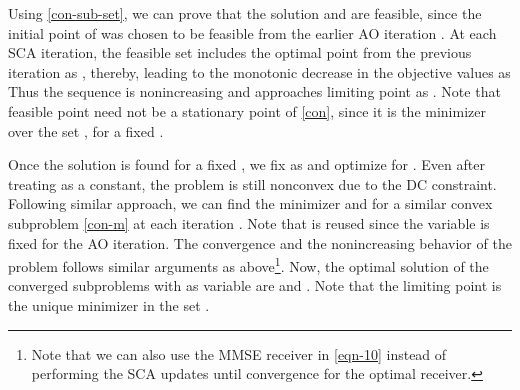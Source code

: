 Using \eqref{con-sub-set}, we can prove that the solution  and  are feasible, since the initial point of  was chosen to be feasible from the earlier \ac{AO} iteration . At each \ac{SCA} iteration, the feasible set includes the optimal point from the previous iteration as , thereby, leading to the monotonic decrease in the objective values \cite{lanckriet2009convergence,scutari_1,quoc2011sequential} as
\iftoggle{single_column}{
\begin{equation} \label{con-convergence}
f(\iter{\mx}{0}{i},\iter{\my}{\ast}{i-1},\iter{\mz}{0}{i}) \geq f(\iter{\mx}{k}{i},\iter{\my}{\ast}{i-1},\iter{\mz}{k}{i}) \geq f(\iter{\mx}{k+1}{i},\iter{\my}{\ast}{i-1},\iter{\mz}{k+1}{i}) \geq f(\iter{\mx}{\ast}{i},\iter{\my}{\ast}{i-1},\iter{\mz}{\ast|\my}{i}). 
\end{equation}}{
\begin{multline} \label{con-convergence}
f(\iter{\mx}{0}{i},\iter{\my}{\ast}{i-1},\iter{\mz}{0}{i}) \geq f(\iter{\mx}{k}{i},\iter{\my}{\ast}{i-1},\iter{\mz}{k}{i}) \\ \geq f(\iter{\mx}{k+1}{i},\iter{\my}{\ast}{i-1},\iter{\mz}{k+1}{i}) \geq f(\iter{\mx}{\ast}{i},\iter{\my}{\ast}{i-1},\iter{\mz}{\ast|\my}{i}). 
\end{multline}}
Thus the sequence  is nonincreasing and approaches limiting point as . Note that feasible point  need not be a stationary point of \eqref{con}, since it is the minimizer over the set , for a fixed \me{\my}.

Once the solution is found for a fixed \me{\my}, we fix \me{\mx} as  and optimize for \me{\my}. Even after treating \me{\mx} as a constant, the problem is still nonconvex due to the \ac{DC} constraint. Following similar approach, we can find the minimizer  and  for a similar convex subproblem \eqref{con-m} at each iteration . Note that  is reused since the variable \me{\mx} is fixed for the  \ac{AO} iteration. The convergence and the nonincreasing behavior of the problem follows similar arguments as above\footnote{Note that we can also use the \ac{MMSE} receiver in \eqref{eqn-10} instead of performing the \ac{SCA} updates until convergence for the optimal receiver.}. Now, the optimal solution of the converged subproblems with \me{\my} as variable are  and . Note that the limiting point  is the unique minimizer in the set .

